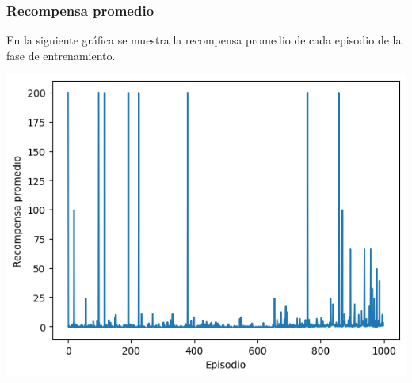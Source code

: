 \documentclass{beamer}
\begin{document}
\begin{frame}
\frametitle{Recompensa promedio}

En la siguiente gráfica se muestra la recompensa promedio de cada episodio de la fase de entrenamiento.

\begin{center}
\includegraphics[scale=0.5]{mean_reward.png}
\end{center}

\end{frame}
\end{document}
